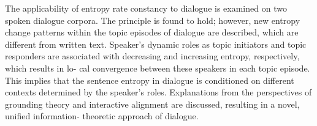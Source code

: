 The applicability of entropy rate constancy to dialogue is examined on two spoken dialogue corpora. The principle is found to hold; however, new entropy change patterns within the topic episodes of dialogue are described, which are different from written text. Speaker's dynamic roles as topic initiators and topic responders are associated with decreasing and increasing entropy, respectively, which results in lo- cal convergence between these speakers in each topic episode. This implies that the sentence entropy in dialogue is conditioned on different contexts determined by the speaker's roles. Explanations from the perspectives of grounding theory and interactive alignment are discussed, resulting in a novel, unified information- theoretic approach of dialogue.
